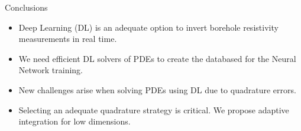 \begin{frame}{Conclusions}

\vspace{0.1cm}
\begin{itemize}
\item Deep Learning (DL) is an adequate option to invert borehole resistivity measurements in real time.
\vspace{0.5cm}
\item We need efficient DL solvers of PDEs to create the databased for the Neural Network training.
\vspace{0.5cm}
\item New challenges arise when solving PDEs using DL due to quadrature errors.
\vspace{0.5cm}
\item Selecting an adequate quadrature strategy is critical. We propose adaptive integration for low dimensions.
\end{itemize}

\end{frame}
